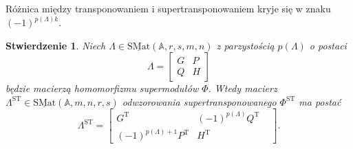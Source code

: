 \documentclass[11pt,a4paper]{report}
\newtheorem{proposition}[theorem]{Stwierdzenie}
\theoremstyle{definition}
\begin{document}
Różnica między transponowaniem i supertransponowaniem kryje się w znaku $(-1)^{p(\Lambda)k}.$
 
\begin{proposition}
	Niech $\Lambda \in \underline{\mathrm{SMat}}(\mathbb{A},r,s,m,n)$ z parzystością $p(\Lambda)$ o postaci
	$$\Lambda = \begin{bmatrix}
	G & P \\
	Q & H
	\end{bmatrix}\!\!$$
	będzie macierzą homomorfizmu supermodułów $\Phi$. Wtedy macierz $\Lambda^{\mathrm{ST}} \in \underline{\mathrm{SMat}}(\mathbb{A},m,n,r,s)$ odwzorowania supertransponowanego $\Phi^{\mathrm{ST}}$ ma postać
	$$\Lambda^{\mathrm{ST}} = \begin{bmatrix}
	G^\mathrm{T}&  (-1)^{p(\Lambda)}Q^\mathrm{T}& \\
	(-1)^{p(\Lambda)+1}P^\mathrm{T}&  H^\mathrm{T}&
	\end{bmatrix}\!\!.$$
\end{proposition}
\end{document}
